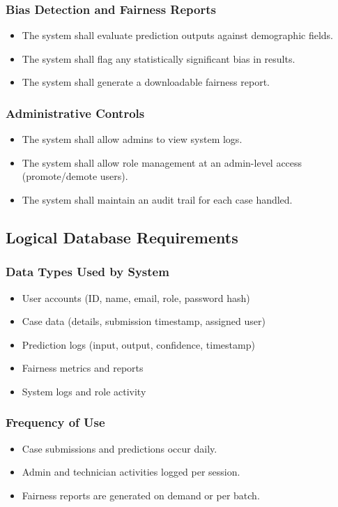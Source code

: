\documentclass[12pt]{article}
\begin{document}
\subsubsection{Bias Detection and Fairness Reports}
\begin{itemize}
    \item The system shall evaluate prediction outputs against demographic fields.
    \item The system shall flag any statistically significant bias in results.
    \item The system shall generate a downloadable fairness report.
\end{itemize}

\subsubsection{Administrative Controls}
\begin{itemize}
    \item The system shall allow admins to view system logs.
    \item The system shall allow role management at an admin-level access (promote/demote users).
    \item The system shall maintain an audit trail for each case handled.
\end{itemize}

\subsection{Logical Database Requirements}

\subsubsection{Data Types Used by System}
\begin{itemize}
    \item User accounts (ID, name, email, role, password hash)
    \item Case data (details, submission timestamp, assigned user)
    \item Prediction logs (input, output, confidence, timestamp)
    \item Fairness metrics and reports
    \item System logs and role activity
\end{itemize}

\subsubsection{Frequency of Use}
\begin{itemize}
    \item Case submissions and predictions occur daily.
    \item Admin and technician activities logged per session.
    \item Fairness reports are generated on demand or per batch.
\end{itemize}
\end{document}
